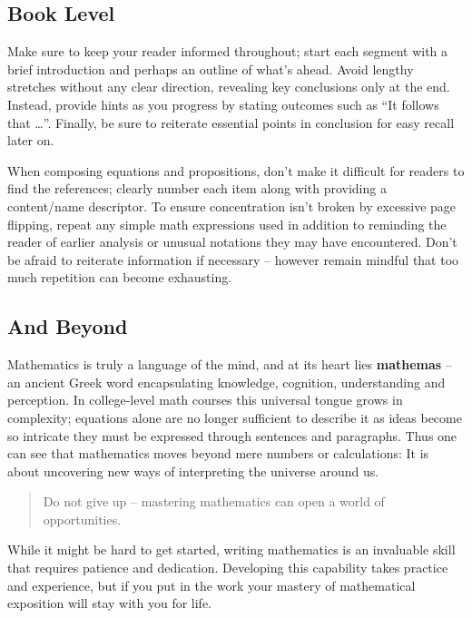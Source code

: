 \documentclass[
  twoside,
  12pt,
  letterpaper,
  fleqn]{article}
\begin{document}
\hypertarget{book-level}{%
\subsection{Book Level}\label{book-level}}

Make sure to keep your reader informed throughout; start each segment
with a brief introduction and perhaps an outline of what's ahead. Avoid
lengthy stretches without any clear direction, revealing key conclusions
only at the end. Instead, provide hints as you progress by stating
outcomes such as ``It follows that \ldots{}''. Finally, be sure to
reiterate essential points in conclusion for easy recall later on.

When composing equations and propositions, don't make it difficult for
readers to find the references; clearly number each item along with
providing a content/name descriptor. To ensure concentration isn't
broken by excessive page flipping, repeat any simple math expressions
used in addition to reminding the reader of earlier analysis or unusual
notations they may have encountered. Don't be afraid to reiterate
information if necessary -- however remain mindful that too much
repetition can become exhausting.

\hypertarget{and-beyond}{%
\subsection{And Beyond}\label{and-beyond}}

Mathematics is truly a language of the mind, and at its heart lies
\textbf{mathemas} -- an ancient Greek word encapsulating knowledge,
cognition, understanding and perception. In college-level math courses
this universal tongue grows in complexity; equations alone are no longer
sufficient to describe it as ideas become so intricate they must be
expressed through sentences and paragraphs. Thus one can see that
mathematics moves beyond mere numbers or calculations: It is about
uncovering new ways of interpreting the universe around us.

\begin{quote}
Do not give up -- mastering mathematics can open a world of
opportunities.
\end{quote}

While it might be hard to get started, writing mathematics is an
invaluable skill that requires patience and dedication. Developing this
capability takes practice and experience, but if you put in the work
your mastery of mathematical exposition will stay with you for life.


\printbibliography



\thispagestyle{empty}
\end{document}
